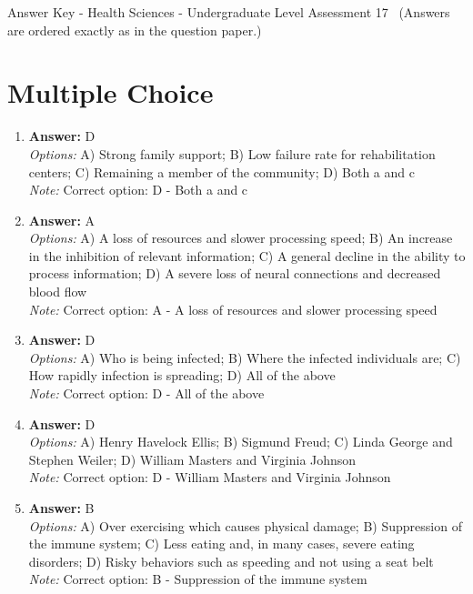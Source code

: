 \documentclass[12pt]{article}
\begin{document}
\begin{center}
Answer Key - Health Sciences - Undergraduate Level Assessment 17 \
\small (Answers are ordered exactly as in the question paper.)
\end{center}

\section*{Multiple Choice}
\begin{enumerate}[label=\arabic*.]
\item \textbf{Answer:} D
\\ \textit{Options:} A) Strong family support; B) Low failure rate for rehabilitation centers; C) Remaining a member of the community; D) Both a and c
\\ \textit{Note:} Correct option: D - Both a and c
\item \textbf{Answer:} A
\\ \textit{Options:} A) A loss of resources and slower processing speed; B) An increase in the inhibition of relevant information; C) A general decline in the ability to process information; D) A severe loss of neural connections and decreased blood flow
\\ \textit{Note:} Correct option: A - A loss of resources and slower processing speed
\item \textbf{Answer:} D
\\ \textit{Options:} A) Who is being infected; B) Where the infected individuals are; C) How rapidly infection is spreading; D) All of the above
\\ \textit{Note:} Correct option: D - All of the above
\item \textbf{Answer:} D
\\ \textit{Options:} A) Henry Havelock Ellis; B) Sigmund Freud; C) Linda George and Stephen Weiler; D) William Masters and Virginia Johnson
\\ \textit{Note:} Correct option: D - William Masters and Virginia Johnson
\item \textbf{Answer:} B
\\ \textit{Options:} A) Over exercising which causes physical damage; B) Suppression of the immune system; C) Less eating and, in many cases, severe eating disorders; D) Risky behaviors such as speeding and not using a seat belt
\\ \textit{Note:} Correct option: B - Suppression of the immune system
\end{enumerate}
\end{document}
